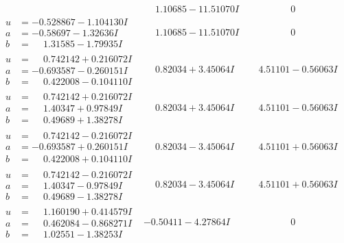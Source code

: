 \documentclass[1p]{elsarticle_modified}
\theoremstyle{definition}
\begin{document}
$$\begin{array}{c|c|c}
 & \phantom{-}1.10685 - 11.51070 I & \phantom{-0.000000 } 0 \\ \hline\begin{aligned}
u &= -0.528867 - 1.104130 I \\
a &= -0.58697 - 1.32636 I \\
b &= \phantom{-}1.31585 - 1.79935 I\end{aligned}
 & \phantom{-}1.10685 - 11.51070 I & \phantom{-0.000000 } 0 \\ \hline\begin{aligned}
u &= \phantom{-}0.742142 + 0.216072 I \\
a &= -0.693587 - 0.260151 I \\
b &= \phantom{-}0.422008 - 0.104110 I\end{aligned}
 & \phantom{-}0.82034 + 3.45064 I & \phantom{-}4.51101 - 0.56063 I \\ \hline\begin{aligned}
u &= \phantom{-}0.742142 + 0.216072 I \\
a &= \phantom{-}1.40347 + 0.97849 I \\
b &= \phantom{-}0.49689 + 1.38278 I\end{aligned}
 & \phantom{-}0.82034 + 3.45064 I & \phantom{-}4.51101 - 0.56063 I \\ \hline\begin{aligned}
u &= \phantom{-}0.742142 - 0.216072 I \\
a &= -0.693587 + 0.260151 I \\
b &= \phantom{-}0.422008 + 0.104110 I\end{aligned}
 & \phantom{-}0.82034 - 3.45064 I & \phantom{-}4.51101 + 0.56063 I \\ \hline\begin{aligned}
u &= \phantom{-}0.742142 - 0.216072 I \\
a &= \phantom{-}1.40347 - 0.97849 I \\
b &= \phantom{-}0.49689 - 1.38278 I\end{aligned}
 & \phantom{-}0.82034 - 3.45064 I & \phantom{-}4.51101 + 0.56063 I \\ \hline\begin{aligned}
u &= \phantom{-}1.160190 + 0.414579 I \\
a &= \phantom{-}0.462084 - 0.868271 I \\
b &= \phantom{-}1.02551 - 1.38253 I\end{aligned}
 & -0.50411 - 4.27864 I & \phantom{-0.000000 } 0 \\ \hline\begin{aligned}

\end{aligned}
\end{array}$$
\end{document}
